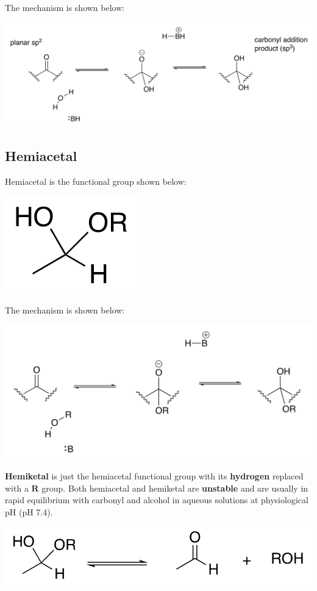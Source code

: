 \documentclass[11pt]{article}
\begin{document}
The mechanism is shown below:
\begin{center}
\includegraphics[width=.9\linewidth]{./images/carbonyl-hydrate-mechanism.png}
\end{center}

\newpage

\subsection{Hemiacetal}
\label{sec:orgaa57c4a}
Hemiacetal is the functional group shown below:

\begin{center}
\includegraphics[scale=1.0]{./images/hemiacetal.png}
\end{center}

The mechanism is shown below:
\begin{center}
\includegraphics[width=.9\linewidth]{./images/hemiacetal-mechanism.png}
\end{center}

\textbf{Hemiketal} is just the hemiacetal functional group with its \textbf{hydrogen} replaced with a \(\boldsymbol{R}\) group. Both hemiacetal and hemiketal are \textbf{unstable} and are usually in rapid equilibrium with carbonyl and alcohol in aqueous solutions at physiological pH (pH 7.4).
\begin{center}
\includegraphics[width=.9\linewidth]{./images/hemiacetal-equilibria.png}
\end{center}
\end{document}
